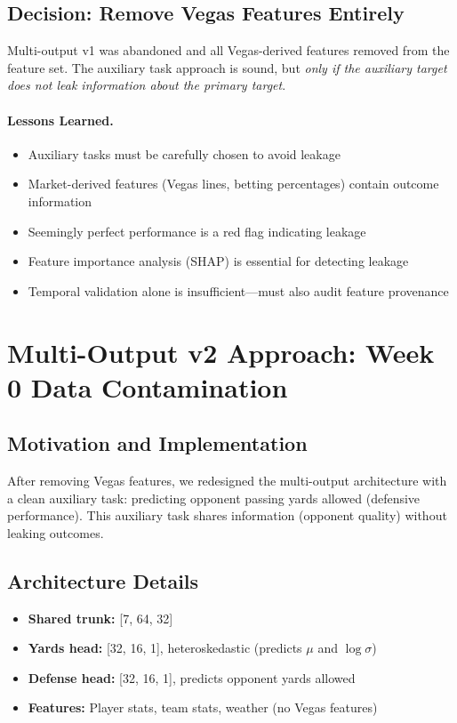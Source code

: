 \subsection{Decision: Remove Vegas Features Entirely}

Multi-output v1 was abandoned and all Vegas-derived features removed from the feature set. The auxiliary task approach is sound, but \emph{only if the auxiliary target does not leak information about the primary target}.

\paragraph{Lessons Learned.}
\begin{itemize}
  \item Auxiliary tasks must be carefully chosen to avoid leakage
  \item Market-derived features (Vegas lines, betting percentages) contain outcome information
  \item Seemingly perfect performance is a red flag indicating leakage
  \item Feature importance analysis (SHAP) is essential for detecting leakage
  \item Temporal validation alone is insufficient—must also audit feature provenance
\end{itemize}

\section{Multi-Output v2 Approach: Week 0 Data Contamination}

\subsection{Motivation and Implementation}

After removing Vegas features, we redesigned the multi-output architecture with a clean auxiliary task: predicting opponent passing yards allowed (defensive performance). This auxiliary task shares information (opponent quality) without leaking outcomes.

\subsection{Architecture Details}

\begin{itemize}
  \item \textbf{Shared trunk:} [7, 64, 32]
  \item \textbf{Yards head:} [32, 16, 1], heteroskedastic (predicts $\mu$ and $\log \sigma$)
  \item \textbf{Defense head:} [32, 16, 1], predicts opponent yards allowed
  \item \textbf{Features:} Player stats, team stats, weather (no Vegas features)
\end{itemize}

